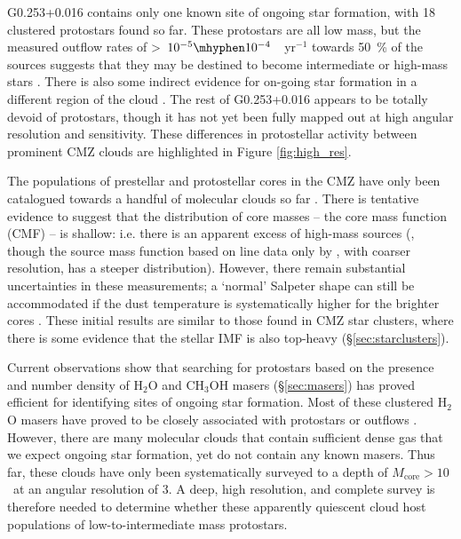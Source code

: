 G0.253+0.016 contains only one known site of ongoing star formation, with 18 clustered protostars found so far. These protostars are all low mass, but the measured outflow rates of \textgreater\ $10^{-5}\mhyphen10^{-4}$~\msun~yr$^{-1}$ towards 50~\% of the sources suggests that they may be destined to become intermediate or high-mass stars \citep{Walker2021}. There is also some indirect evidence for on-going star formation in a different region of the cloud \citep{Henshaw2022}. The rest of G0.253+0.016 appears to be totally devoid of protostars, though it has not yet been fully mapped out at high angular resolution and sensitivity. These differences in protostellar activity between prominent CMZ clouds are highlighted in Figure \ref{fig:high_res}.

The populations of prestellar and protostellar cores in the CMZ have only been catalogued towards a handful of molecular clouds so far \citep[][Fig.~\ref{fig:high_res}]{Ginsburg2018b,Lu2020,Lu2021,Walker2021}. There is tentative evidence to suggest that the distribution of core masses -- the core mass function (CMF) -- is shallow: i.e. there is an apparent excess of high-mass sources (\citealp{Lu2020}, though the source mass function based on line data only by \citealp{Uehara2019}, with coarser resolution,  has a steeper distribution). However, there remain substantial uncertainties in these measurements; a `normal' Salpeter shape can still be accommodated if the dust temperature is systematically higher for the brighter cores \citep{Lu2020}. These initial results are similar to those found in CMZ star clusters, where there is some evidence that the stellar IMF is also top-heavy (\S\ref{sec:starclusters}).

Current observations show that searching for protostars based on the presence and number density of H$_{2}$O and CH$_{3}$OH masers (\S\ref{sec:masers})
has proved efficient for identifying sites of ongoing star formation.
Most of these clustered H$_{2}$O masers have proved to be closely associated with protostars or outflows \citep{Walker2021,Lu2021}. However, there are many molecular clouds that contain sufficient dense gas that we expect ongoing star formation, yet do not contain any known masers. Thus far, these clouds have only been systematically surveyed to a depth of $M_{\mathrm{core}}>10$~\msun at an angular resolution of 3\arcsec \citep{Battersby2020,Hatchfield2020}. A deep, high resolution, and complete survey is therefore needed to determine whether these apparently quiescent cloud host populations of low-to-intermediate mass protostars.

